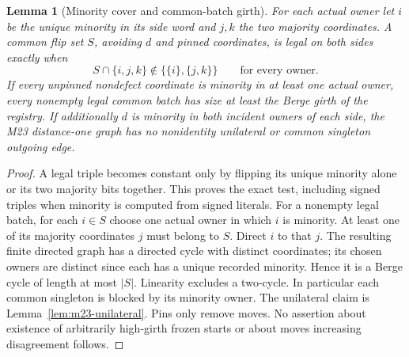 \documentclass[11pt]{article}
\newtheorem{lemma}[theorem]{Lemma}
\begin{document}
\begin{lemma}[Minority cover and common-batch girth]\label{lem:bw17-minority}
For each actual owner let $i$ be the unique minority in its side word and $j,k$ the two majority coordinates. A common flip set $S$, avoiding $d$ and pinned coordinates, is legal on both sides exactly when
\[
 S\cap\{i,j,k\}\notin\{\{i\},\{j,k\}\}
 \qquad\text{for every owner}.
\]
If every unpinned nondefect coordinate is minority in at least one actual owner, every nonempty legal common batch has size at least the Berge girth of the registry. If additionally $d$ is minority in both incident owners of each side, the M23 distance-one graph has no nonidentity unilateral or common singleton outgoing edge.
\end{lemma}
\begin{proof}
A legal triple becomes constant only by flipping its unique minority alone or its two majority bits together. This proves the exact test, including signed triples when minority is computed from signed literals. For a nonempty legal batch, for each $i\in S$ choose one actual owner in which $i$ is minority. At least one of its majority coordinates $j$ must belong to $S$. Direct $i$ to that $j$. The resulting finite directed graph has a directed cycle with distinct coordinates; its chosen owners are distinct since each has a unique recorded minority. Hence it is a Berge cycle of length at most $|S|$. Linearity excludes a two-cycle. In particular each common singleton is blocked by its minority owner. The unilateral claim is Lemma~\ref{lem:m23-unilateral}. Pins only remove moves. No assertion about existence of arbitrarily high-girth frozen starts or about moves increasing disagreement follows.
\end{proof}
\end{document}
